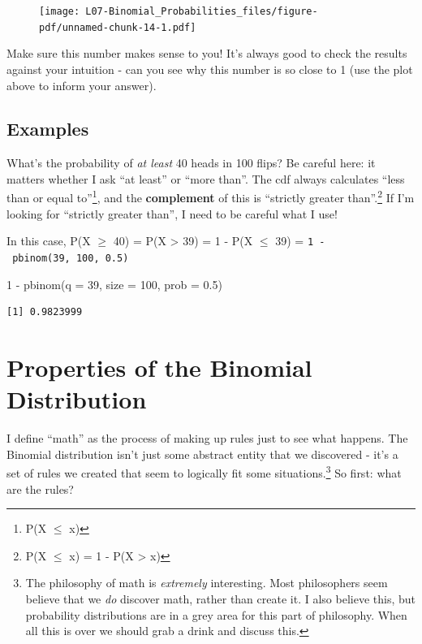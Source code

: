 \documentclass[
  letterpaper,
  DIV=11,
  numbers=noendperiod,
  oneside]{scrreprt}
\newenvironment{Shaded}{\begin{snugshade}}{\end{snugshade}}
\newcommand{\AttributeTok}[1]{\textcolor[rgb]{0.40,0.45,0.13}{#1}}
\newcommand{\DecValTok}[1]{\textcolor[rgb]{0.68,0.00,0.00}{#1}}
\newcommand{\FloatTok}[1]{\textcolor[rgb]{0.68,0.00,0.00}{#1}}
\newcommand{\FunctionTok}[1]{\textcolor[rgb]{0.28,0.35,0.67}{#1}}
\newcommand{\NormalTok}[1]{\textcolor[rgb]{0.00,0.23,0.31}{#1}}
\newcommand{\SpecialCharTok}[1]{\textcolor[rgb]{0.37,0.37,0.37}{#1}}
\begin{document}
\begin{figure}[H]

{\centering \texttt{[image: L07-Binomial\_Probabilities\_files/figure-pdf/unnamed-chunk-14-1.pdf]}

}

\end{figure}

Make sure this number makes sense to you! It's always good to check the
results against your intuition - can you see why this number is so close
to 1 (use the plot above to inform your answer).

\hypertarget{examples-2}{%
\subsection{Examples}\label{examples-2}}

What's the probability of \emph{at least} 40 heads in 100 flips? Be
careful here: it matters whether I ask ``at least'' or ``more than''.
The cdf always calculates ``less than or equal to''\footnote{P(X \(\le\)
  x)}, and the \textbf{complement} of this is ``strictly greater
than''.\footnote{P(X \(\le\) x) = 1 - P(X \textgreater{} x)} If I'm
looking for ``strictly greater than'', I need to be careful what I use!

In this case, P(X \(\ge\) 40) = P(X \textgreater{} 39) = 1 - P(X \(\le\)
39) = \texttt{1\ -\ pbinom(39,\ 100,\ 0.5)}

\begin{Shaded}
\begin{Highlighting}[]
\DecValTok{1} \SpecialCharTok{{-}} \FunctionTok{pbinom}\NormalTok{(}\AttributeTok{q =} \DecValTok{39}\NormalTok{, }\AttributeTok{size =} \DecValTok{100}\NormalTok{, }\AttributeTok{prob =} \FloatTok{0.5}\NormalTok{)}
\end{Highlighting}
\end{Shaded}

\begin{verbatim}
[1] 0.9823999
\end{verbatim}

\hypertarget{properties-of-the-binomial-distribution}{%
\section{Properties of the Binomial
Distribution}\label{properties-of-the-binomial-distribution}}

I define ``math'' as the process of making up rules just to see what
happens. The Binomial distribution isn't just some abstract entity that
we discovered - it's a set of rules we created that seem to logically
fit some situations.\footnote{The philosophy of math is \emph{extremely}
  interesting. Most philosophers seem believe that we \emph{do} discover
  math, rather than create it. I also believe this, but probability
  distributions are in a grey area for this part of philosophy. When all
  this is over we should grab a drink and discuss this.} So first: what
are the rules?
\end{document}
